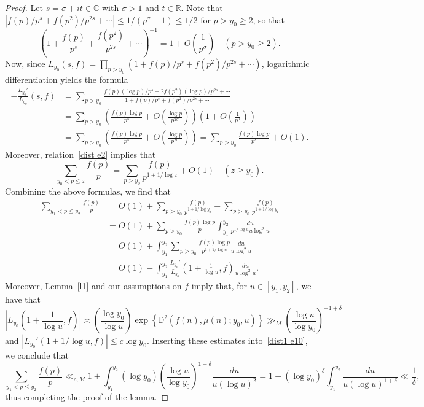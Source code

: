 \documentclass[12pt]{amsart}
\theoremstyle{remark}
\newcommand {\SR} {{\mathbb R}}
\newcommand {\SC} {{\mathbb C}}
\newcommand {\SD} {{\mathbb D}}
\newcommand{\bsp}{\begin{split}}
\newcommand{\be}{\begin{equation}}
\newcommand{\ee}{\end{equation}}
\numberwithin{equation}{section}
\begin{document}
\begin{proof} Let $s=\sigma+it\in\SC$ with $\sigma>1$ and $t\in\SR$. Note that $|f(p)/p^s+f(p^2)/p^{2s}+\cdots|\le1/(p^\sigma-1)\le1/2$ for $p>y_0\ge2$, so that
$$
\left(1+\frac{f(p)}{p^s}+\frac{f(p^2)}{p^{2s}}+\cdots\right)^{-1}=1+O\left(\frac1{p^\sigma}\right)\quad(p>y_0\ge2).
$$
Now, since $L_{y_0}(s,f)=\prod_{p>y_0}(1+f(p)/p^s+f(p^2)/p^{2s}+\cdots)$, logarithmic differentiation yields the formula
\begin{align*}
-\frac{L_{y_0}'}{L_{y_0}}(s,f)
&=\sum_{p>y_0} \frac{f(p)(\log p)/p^s+2f(p^2)(\log p)/p^{2s}+\cdots}{1+f(p)/p^s+f(p^2)/p^{2s}+\cdots}\\
&=\sum_{p>y_0}\left(\frac{f(p)\log p}{p^s}+O\left(\frac{\log p}{p^{2\sigma}}\right)\right)\left(1+O\left(\frac1{p^\sigma}\right)\right)\\
&=\sum_{p>y_0}\left(\frac{f(p)\log p}{p^s}+O\left(\frac{\log p}{p^{2\sigma}}\right)\right)
=\sum_{p>y_0}\frac{f(p)\log p}{p^s}+O(1).
\end{align*}
Moreover, relation~\eqref{dist e2} implies that
$$
\sum_{y_0<p\le z}\frac{f(p)}p=\sum_{p>y_0}\frac{f(p)}{p^{1+1/\log z}}+O(1)\quad(z\ge y_0).
$$
Combining the above formulas, we find that
\be\label{dist1 e10}\bsp
\sum_{y_1<p\le y_2}\frac{f(p)}p&=O(1)+\sum_{p>y_0}\frac{f(p)}{p^{1+1/\log y_2}}-\sum_{p>y_0}\frac{f(p)}{p^{1+1/\log y_1}}\\
&=O(1) + \sum_{p>y_0} \frac{f(p)\log p}{p} \int_{y_1}^{y_2}\frac{du}{p^{1/\log u}u\log^2u}\\
&=O(1) + \int_{y_1}^{y_2} \sum_{p>y_0} \frac{f(p)\log p}{p^{1+1/\log u}}\frac{du}{u\log^2u}\\
&=O(1) - \int_{y_1}^{y_2} \frac{L_{y_0}'}{L_{y_0}}\left(1+\frac1{\log u},f\right)\frac{du}{u\log^2u}.
\end{split}\ee
Moreover, Lemma~\ref{l1} and our assumptions on $f$ imply that, for $u\in[y_1,y_2]$, we have that
$$
\left|L_{y_0}\left(1+\frac1{\log u},f\right)\right|\asymp\left(\frac{\log y_0}{\log u}\right)\exp\left\{\SD^2(f(n),\mu(n);y_0,u)\right\}\gg_M\left(\frac{\log u}{\log y_0}\right)^{-1+\delta}
$$
and
$|L_{y_0}'(1+1/\log u,f)|\le c\log y_0$. Inserting these estimates into~\eqref{dist1 e10}, we conclude that
$$
\sum_{y_1<p\le y_2}\frac{f(p)}p\ll_{c,M}1+\int_{y_1}^{y_2}(\log y_0)\left(\frac{\log u}{\log y_0}\right)^{1-\delta} \frac{du}{u(\log u)^2}
=1+(\log y_0)^\delta\int_{y_1}^{y_2}\frac{du}{u(\log u)^{1+\delta}} \ll\frac1\delta,
$$
thus completing the proof of the lemma.

\end{proof}
\end{document}
